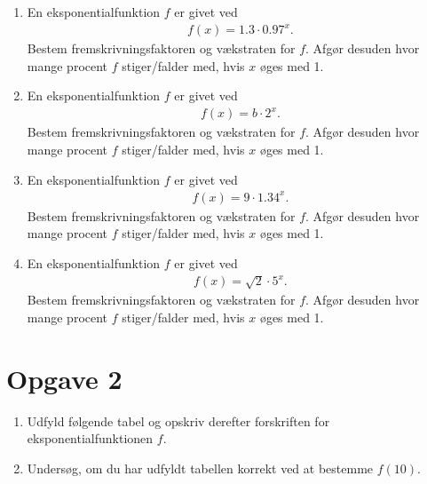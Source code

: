 \documentclass[12pt]{article}
\begin{document}
\begin{enumerate}[label=\roman*)]
	\item En eksponentialfunktion $f$ er givet ved
	\begin{align*}
		f(x) = 1.3\cdot 0.97^x.
	\end{align*}
	Bestem fremskrivningsfaktoren og vækstraten for $f$. Afgør desuden hvor mange procent $f$ stiger/falder med, hvis $x$ øges med 1.
	\item En eksponentialfunktion $f$ er givet ved
	\begin{align*}
		f(x) = b\cdot 2^x.
	\end{align*}
	Bestem fremskrivningsfaktoren og vækstraten for $f$. Afgør desuden hvor mange procent $f$ stiger/falder med, hvis $x$ øges med 1.
	\item En eksponentialfunktion $f$ er givet ved
	\begin{align*}
		f(x) = 9\cdot 1.34^x.
	\end{align*}
	Bestem fremskrivningsfaktoren og vækstraten for $f$. Afgør desuden hvor mange procent $f$ stiger/falder med, hvis $x$ øges med 1.
	\item En eksponentialfunktion $f$ er givet ved
	\begin{align*}
		f(x) = \sqrt{2}\cdot 5^x.
	\end{align*}
	Bestem fremskrivningsfaktoren og vækstraten for $f$. Afgør desuden hvor mange procent $f$ stiger/falder med, hvis $x$ øges med 1.
\end{enumerate}

\section*{Opgave 2}
\begin{enumerate}[label=\roman*)]
	\item Udfyld følgende tabel og opskriv derefter forskriften for eksponentialfunktionen $f$.
	\item Undersøg, om du har udfyldt tabellen korrekt ved at bestemme $f(10)$. 
\end{enumerate}

\begin{center}
\end{center}
\end{document}
